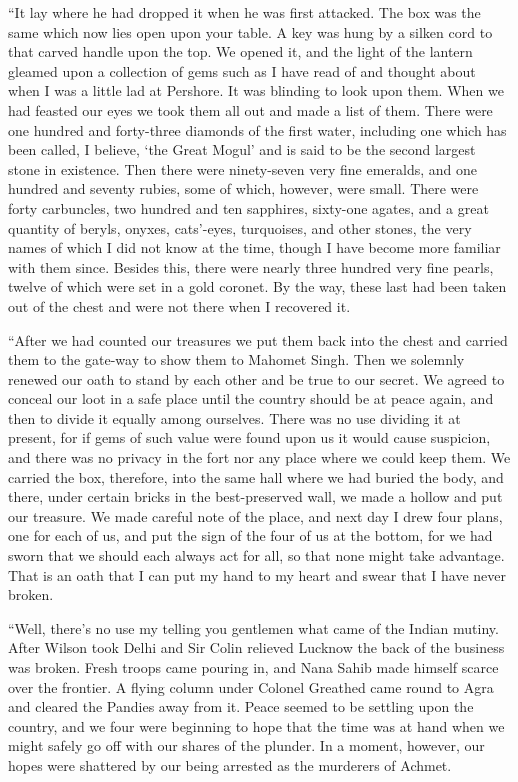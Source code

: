 \documentclass[12pt,english,oneside]{book}
\begin{document}
{}``It lay where he had dropped it when he was first attacked. The
box was the same which now lies open upon your table. A key was hung
by a silken cord to that carved handle upon the top. We opened it,
and the light of the lantern gleamed upon a collection of gems such
as I have read of and thought about when I was a little lad at Pershore.
It was blinding to look upon them. When we had feasted our eyes we
took them all out and made a list of them. There were one hundred
and forty-three diamonds of the first water, including one which has
been called, I believe, `the Great Mogul' and is said to be the second
largest stone in existence. Then there were ninety-seven very fine
emeralds, and one hundred and seventy rubies, some of which, however,
were small. There were forty carbuncles, two hundred and ten sapphires,
sixty-one agates, and a great quantity of beryls, onyxes, cats'-eyes,
turquoises, and other stones, the very names of which I did not know
at the time, though I have become more familiar with them since. Besides
this, there were nearly three hundred very fine pearls, twelve of
which were set in a gold coronet. By the way, these last had been
taken out of the chest and were not there when I recovered it.

{}``After we had counted our treasures we put them back into the
chest and carried them to the gate-way to show them to Mahomet Singh.
Then we solemnly renewed our oath to stand by each other and be true
to our secret. We agreed to conceal our loot in a safe place until
the country should be at peace again, and then to divide it equally
among ourselves. There was no use dividing it at present, for if gems
of such value were found upon us it would cause suspicion, and there
was no privacy in the fort nor any place where we could keep them.
We carried the box, therefore, into the same hall where we had buried
the body, and there, under certain bricks in the best-preserved wall,
we made a hollow and put our treasure. We made careful note of the
place, and next day I drew four plans, one for each of us, and put
the sign of the four of us at the bottom, for we had sworn that we
should each always act for all, so that none might take advantage.
That is an oath that I can put my hand to my heart and swear that
I have never broken.

{}``Well, there's no use my telling you gentlemen what came of the
Indian mutiny. After Wilson took Delhi and Sir Colin relieved Lucknow
the back of the business was broken. Fresh troops came pouring in,
and Nana Sahib made himself scarce over the frontier. A flying column
under Colonel Greathed came round to Agra and cleared the Pandies
away from it. Peace seemed to be settling upon the country, and we
four were beginning to hope that the time was at hand when we might
safely go off with our shares of the plunder. In a moment, however,
our hopes were shattered by our being arrested as the murderers of
Achmet.
\end{document}

